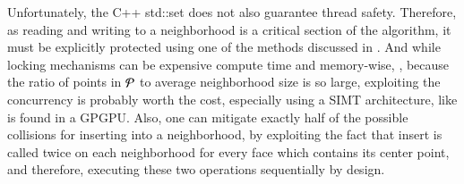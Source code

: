 Unfortunately, the C++ std::set does not also guarantee thread safety. Therefore, as reading and writing to a neighborhood is a critical section of the algorithm, it must be explicitly protected using one of the methods discussed in . And while locking mechanisms can be expensive compute time and memory-wise, , because the ratio of points in $\mathcal{P}$ to average neighborhood size is so large, exploiting the concurrency is probably worth the cost, especially using a SIMT architecture, like is found in a GPGPU. Also, one can mitigate exactly half of the possible collisions for inserting into a neighborhood, by exploiting the fact that insert is called twice on each neighborhood for every face which contains its center point, and therefore, executing these two operations sequentially by design.

